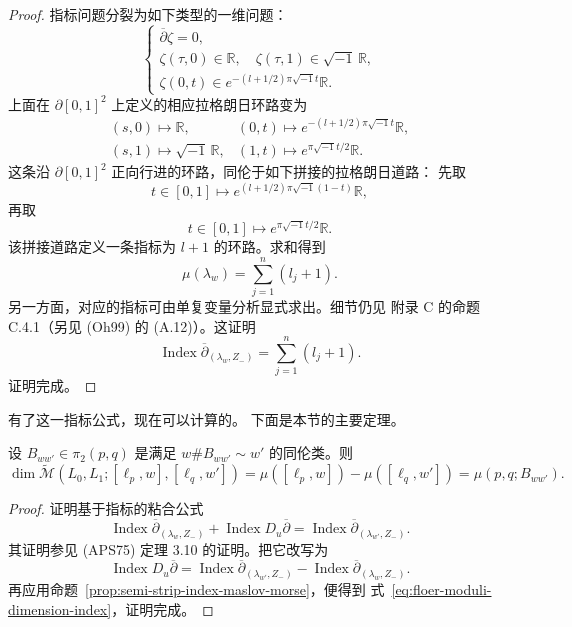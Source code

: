 \begin{proof}
指标问题分裂为如下类型的一维问题：
\[
 \begin{cases}
 \overline\partial\zeta=0,\\
 \zeta(\tau,0)\in\mathbb R,
 \quad\zeta(\tau,1)\in\sqrt{-1}\,\mathbb R,\\
 \zeta(0,t)\in e^{-(l+1/2)\pi\sqrt{-1}t}\mathbb R.
 \end{cases}
\]
上面在 $\partial[0,1]^2$ 上定义的相应拉格朗日环路变为
\[
\begin{array}{ll}
 (s,0)\longmapsto\mathbb R,
 & (0,t)\longmapsto e^{-(l+1/2)\pi\sqrt{-1}t}\mathbb R,\\
 (s,1)\longmapsto\sqrt{-1}\,\mathbb R,
 & (1,t)\longmapsto e^{\pi\sqrt{-1}t/2}\mathbb R.
\end{array}
\]
这条沿 $\partial[0,1]^2$ 正向行进的环路，同伦于如下拼接的拉格朗日道路：
先取
\[
 t\in[0,1]\longmapsto e^{(l+1/2)\pi\sqrt{-1}(1-t)}\mathbb R,
\]
再取
\[
 t\in[0,1]\longmapsto e^{\pi\sqrt{-1}t/2}\mathbb R.
\]
该拼接道路定义一条\personMaslov{}指标为 $l+1$ 的环路。求和得到
\[
 \mu(\lambda_w)=\sum_{j=1}^n(l_j+1).
\]
另一方面，对应的\personFredholm{}指标可由单复变量\personFourier{}分析显式求出。细节仍见
附录 C 的命题 C.4.1（另见 (Oh99) 的 (A.12)）。这证明
\begin{equation}
 \operatorname{Index}\overline\partial_{(\lambda_w,Z_-)}
 =\sum_{j=1}^n(l_j+1).
 \label{eq:semi-strip-index-explicit}
\end{equation}
证明完成。
\end{proof}

有了这一指标公式，现在可以计算\termFloerModuliSpace{}的\termVirtualDimension{}。
下面是本节的主要定理。

\begin{theorem}
\label{thm:floer-moduli-dimension-maslov-difference}
设 $B_{ww'}\in\pi_2(p,q)$ 是满足 $w\#B_{ww'}\sim w'$ 的同伦类。则
\begin{equation}
 \dim\widetilde{\mathcal M}
 (L_0,L_1;[\ell_p,w],[\ell_q,w'])
 =\mu([\ell_p,w])-\mu([\ell_q,w'])
 =\mu(p,q;B_{ww'}).
 \label{eq:floer-moduli-dimension-index}
\end{equation}
\end{theorem}

\begin{proof}
证明基于\personFredholm{}指标的粘合公式
\begin{equation}
 \operatorname{Index}\overline\partial_{(\lambda_w,Z_-)}
 +\operatorname{Index}D_u\overline\partial
 =\operatorname{Index}\overline\partial_{(\lambda_{w'},Z_-)}.
 \label{eq:fredholm-index-gluing-ch15}
\end{equation}
其证明参见 (APS75) 定理 3.10 的证明。把它改写为
\[
 \operatorname{Index}D_u\overline\partial
 =\operatorname{Index}\overline\partial_{(\lambda_{w'},Z_-)}
 -\operatorname{Index}\overline\partial_{(\lambda_w,Z_-)}.
\]
再应用命题~\ref{prop:semi-strip-index-maslov-morse}，便得到
式~\eqref{eq:floer-moduli-dimension-index}，证明完成。
\end{proof}

